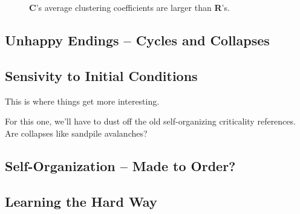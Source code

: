 \documentclass[twoside,twocolumn]{article}
\begin{document}
\begin{figure}
  \caption{\textbf{C}'s average clustering coefficients are larger than \textbf{R}'s.}
  \label{fig:figDd1024}
\end{figure}

\subsection{Unhappy Endings -- Cycles and Collapses}

\subsection{Sensivity to Initial Conditions}

This is where things get more interesting.

For this one, we'll have to dust off the old self-organizing criticality
references. Are collapses like sandpile avalanches?

\subsection{Self-Organization -- Made to Order?}

\subsection{Learning the Hard Way}
\end{document}
